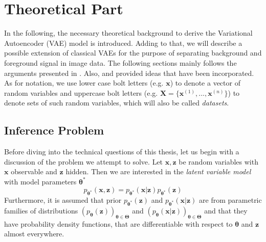 \documentclass[12pt]{report}
\theoremstyle{definition}
\begin{document}
\chapter{Theoretical Part}

In the following, the necessary theoretical background to derive the Variational Autoencoder (VAE) model is introduced. Adding to that, we will describe a possible extension of classical VAEs for the purpose of separating background and foreground signal in image data.
The following sections mainly follows the arguments presented in \cite{kingma1}. Also, \cite{kingma2} and \cite{stanford} provided ideas that have been incorporated. As for notation, we use lower case bolt letters (e.g. $\mathbf{x}$) to denote a vector of random variables and uppercase bolt letters (e.g. $\mathbf{X} = \{ \mathbf{x}^{(1)}, ..., \mathbf{x}^{(n)}\}$) to denote sets of such random variables, which will also be called \emph{datasets}.

\section{Inference Problem}
Before diving into the technical questions of this thesis, let us begin with a discussion of the problem we attempt to solve. Let $\mathbf{x}, \mathbf{z}$ be random variables with $\mathbf{x}$ observable and $\mathbf{z}$ hidden. Then we are interested in the \textit{latent variable model} with model parameters $\pmb{\theta}^*$
\begin{equation}
	p_{\pmb{\theta}^*}(\mathbf{x}, \mathbf{z}) = p_{\pmb{\theta}^*}(\mathbf{x}| \mathbf{z})p_{\pmb{\theta}^*}(\mathbf{z})
\end{equation}
Furthermore, it is assumed that prior $p_{\pmb{\theta}^*}(\mathbf{z})$ and $p_{\pmb{\theta}^*}(\mathbf{x}|\mathbf{z})$ are from parametric families of distributions $(p_{\pmb{\theta}}(\mathbf{z}))_{\pmb{\theta} \in \pmb{\Theta}}$ and $(p_{\pmb{\theta}}(\mathbf{x}|\mathbf{z}))_{\pmb{\theta} \in \pmb{\Theta}}$ and that they have probability density functions, that are differentiable with respect to $\pmb{\theta}$ and $\mathbf{z}$ almost everywhere.
\end{document}
